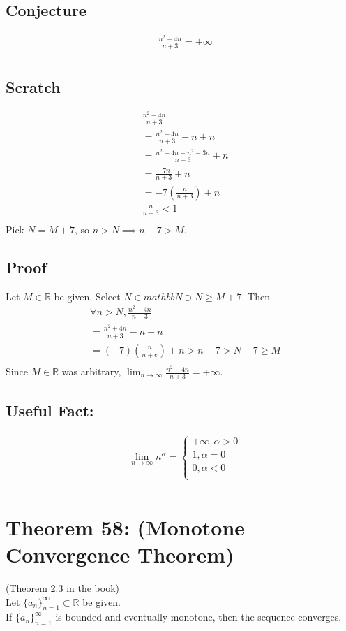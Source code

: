 \documentclass{article}
\begin{document}
\subsection{Conjecture}
\begin{align*}
 	& \frac{n^2 - 4n}{n + 3} = +\infty \\
\end{align*}
\subsection{Scratch}
\begin{align*}
 	& \frac{n^2 - 4n}{n + 3} \\
 	& = \frac{n^2 - 4n}{n + 3} - n + n \\
 	& = \frac{n^2 - 4n - n^2 - 3n}{n+3} + n \\
 	& = \frac{-7n}{n + 3} + n \\
 	& = -7 (\frac{n}{n + 3}) + n \\
 	& \frac{n}{n + 3} < 1 \\
\end{align*}
Pick $N = M + 7$, so $n > N \implies n - 7 > M$.
\subsection{Proof}
Let $M \in \mathbb{R}$ be given. Select $N \in mathbb{N} \ni N \geq M + 7$. Then
\begin{align*}
 	& \forall n > N, \frac{n^2 - 4n}{n + 3} \\
 	&  = \frac{n^2 + 4n}{n + 3} - n + n \\
 	& = (-7)(\frac{n}{n+e}) + n > n - 7 > N - 7 \geq M \\
\end{align*}
Since $M \in \mathbb{R}$ was arbitrary, $\lim_{n \rightarrow \infty} \frac{n^2 - 4n}{n+3} = +\infty$.
\subsection{Useful Fact:}
\begin{align*}
 	& \lim_{n \rightarrow \infty} n^\alpha = \begin{cases} +\infty, \alpha > 0\\
 	1, \alpha = 0\\
 	0, \alpha < 0\\
 	\end{cases}\\
\end{align*}
\section{Theorem 58: (Monotone Convergence Theorem)}
(Theorem 2.3 in the book)\\
Let $\{ a_n \}_{n = 1}^\infty \subset \mathbb{R}$ be given. \\ If $ \{ a_n \}_{n = 1}^\infty$ is bounded and eventually monotone, then the sequence converges.
\end{document}
